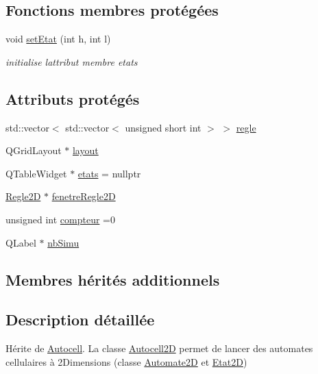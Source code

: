 \subsection*{Fonctions membres protégées}
\begin{DoxyCompactItemize}
\item 
void \hyperlink{class_autocell2_d_a470fdb5c648b9b0e951476fb9d5f3b96}{set\+Etat} (int h, int l)
\begin{DoxyCompactList}\small\item\em initialise l\textquotesingle{}attribut membre etats \end{DoxyCompactList}\end{DoxyCompactItemize}
\subsection*{Attributs protégés}
\begin{DoxyCompactItemize}
\item 
std\+::vector$<$ std\+::vector$<$ unsigned short int $>$ $>$ \hyperlink{class_autocell2_d_a238eef6674e510f6ce39d93427c6cad5}{regle}
\item 
Q\+Grid\+Layout $\ast$ \hyperlink{class_autocell2_d_ae935ff1610be1b1375f62b6877c35afb}{layout}
\item 
Q\+Table\+Widget $\ast$ \hyperlink{class_autocell2_d_a3a7359db79b875b93bcf89ab8377cf7e}{etats} = nullptr
\item 
\hyperlink{class_regle2_d}{Regle2D} $\ast$ \hyperlink{class_autocell2_d_a46226226228ceb3dd4c5cd4a04867a85}{fenetre\+Regle2D}
\item 
unsigned int \hyperlink{class_autocell2_d_a8d5918116d265492d58a7cdddd7de49d}{compteur} =0
\item 
Q\+Label $\ast$ \hyperlink{class_autocell2_d_a77c628582ad0c795ec3d2e1733f2d53f}{nb\+Simu}
\end{DoxyCompactItemize}
\subsection*{Membres hérités additionnels}


\subsection{Description détaillée}
Hérite de \hyperlink{class_autocell}{Autocell}. La classe \hyperlink{class_autocell2_d}{Autocell2D} permet de lancer des automates cellulaires à 2\+Dimensions (classe \hyperlink{class_automate2_d}{Automate2D} et \hyperlink{class_etat2_d}{Etat2D}) 

